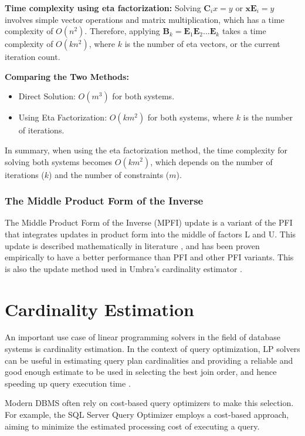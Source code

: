 \textbf{Time complexity using eta factorization:}
Solving \(\mathbf{C}_i x = y\) or  \(\mathbf{x}\mathbf{E}_i = y\) involves
simple vector operations and matrix multiplication,
which has a time complexity of \(O(n^2)\).
Therefore, applying \( \mathbf{B}_k = \mathbf{E}_1 \mathbf{E}_2 \ldots \mathbf{E}_k\)
takes a time complexity of \(O(kn^2)\), where $k$ is the number of eta vectors,
or the current iteration count.

\textbf{Comparing the Two Methods:}
\begin{itemize}
    \item Direct Solution: \(O(m^3)\) for both systems.
    \item Using Eta Factorization: \(O(km^2)\) for both systems,
          where \(k\) is the number of iterations.
\end{itemize}

In summary, when using the eta factorization method,
the time complexity for solving both systems becomes \(O(km^2)\),
which depends on the number of iterations (\(k\)) and the number of
constraints (\(m\)).

\subsubsection{The Middle Product Form of the Inverse }
The Middle Product Form of the Inverse (MPFI) update is a variant of the PFI that integrates
updates in product form into the middle of factors L and U.
This update
is described mathematically in literature \parencite{huangfu2015novel}, and has been proven empirically to have a better performance than PFI and other PFI variants.
This is also the update method used in Umbra's cardinality estimator \parencite{Umbra}.

\section{Cardinality Estimation}\label{section:cardinality-estimate}
An important use case of linear programming solvers in the field of database systems is
cardinality estimation.
In the context of query optimization, LP solvers can be useful in estimating query plan
cardinalities and providing a reliable and good enough estimate to be used in selecting
the best join order, and hence speeding up query execution time \parencite{leis2018query}.

Modern DBMS often rely on
cost-based query optimizers to make this selection.
For example, the SQL Server Query Optimizer
\parencite{microsoft2023cardinality} employs a
cost-based approach, aiming to minimize the estimated
processing cost of executing a query.

